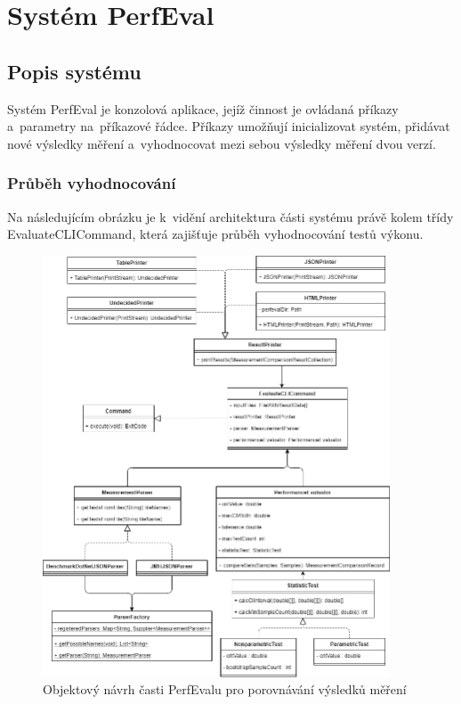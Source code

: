 \chapter{Systém PerfEval}

\section{Popis systému}

Systém PerfEval je konzolová aplikace, jejíž činnost je ovládaná příkazy a~parametry na~příkazové řádce.
Příkazy umožňují inicializovat systém, přidávat nové výsledky měření a~vyhodnocovat mezi sebou výsledky
měření dvou verzí.

\subsection{Průběh vyhodnocování}

Na následujícím obrázku je k~vidění architektura části systému právě kolem třídy EvaluateCLICommand, která zajišťuje
průběh vyhodnocování testů výkonu.

    \begin{figure}[h!]
        \centering
        \includegraphics[width=0.92\textwidth]{../img/perfeval_evaluate.png}
        \caption{Objektový návrh časti PerfEvalu pro porovnávání výsledků měření}
    \end{figure}

